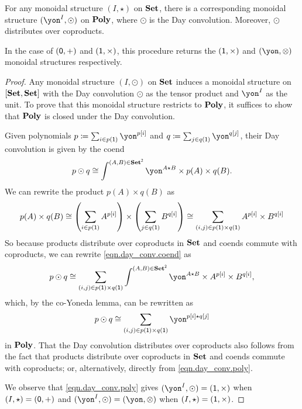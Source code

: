 \documentclass[Book-Poly]{subfiles}
\begin{document}
\begin{proposition} \label{prop.day}
For any monoidal structure $(I,\star)$ on $\mathbf{Set}$, there is a corresponding monoidal structure $(\yon^I, \odot)$ on $\mathbf{Poly}$, where $\odot$ is the Day convolution.
Moreover, $\odot$ distributes over coproducts. 

In the case of $(\textsf{0},+)$ and $(\textsf{1},\times)$, this procedure returns the $(\textsf{1},\times)$ and $(\yon,\otimes)$ monoidal structures respectively.
\end{proposition}
\begin{proof}
Any monoidal structure $(I, \odot)$ on $\mathbf{Set}$ induces a monoidal structure on $[\mathbf{Set},\mathbf{Set}]$ with the Day convolution $\odot$ as the tensor product and $\yon^I$ as the unit.
To prove that this monoidal structure restricts to $\mathbf{Poly}$, it suffices to show that $\mathbf{Poly}$ is closed under the Day convolution.

Given polynomials $p\coloneqq\sum_{i \in p(\1)} \yon^{p[i]}$ and $q\coloneqq\sum_{j \in q(\1)} \yon^{q[j]}$, their Day convolution is given by the coend
\begin{equation} \label{eqn.day_conv.coend}
    p \odot q \iso \int^{(A,B)\in\smset^\2} \yon^{A \star B} \times p(A) \times q(B).
\end{equation}
We can rewrite the product $p(A) \times q(B)$ as
\[
    p(A) \times q(B) \iso \left(\sum_{i \in p(\1)} A^{p[i]}\right) \times \left(\sum_{j \in q(\1)} B^{q[i]}\right) \iso \sum_{(i,j) \in p(\1) \times q(\1)} A^{p[i]} \times B^{q[i]} %
\]
So because products distribute over coproducts in $\mathbf{Set}$ and coends commute with coproducts, we can rewrite \eqref{eqn.day_conv.coend} as
\[
    p \odot q \iso \sum_{(i,j) \in p(\1) \times q(\1)} \int^{(A,B)\in\smset^\2} \yon^{A \star B} \times A^{p[i]} \times B^{q[i]},
\]
which, by the co-Yoneda lemma, can be rewritten as
\begin{equation} \label{eqn.day_conv.poly}
    p \odot q \iso \sum_{(i,j) \in p(\1) \times q(\1)} \yon^{p[i] \star q[j]}
\end{equation}
in $\mathbf{Poly}$.
That the Day convolution distributes over coproducts also follows from the fact that products distribute over coproducts in $\mathbf{Set}$ and coends commute with coproducts; or, alternatively, directly from \eqref{eqn.day_conv.poly}.

We observe that \eqref{eqn.day_conv.poly} gives $(\yon^I, \odot) = (\1, \times)$ when $(I, \star) = (\textsf{0}, +)$ and $(\yon^I, \odot) = (\yon, \otimes)$ when $(I, \star) = (\textsf{1}, \times)$.
\end{proof}
\end{document}
